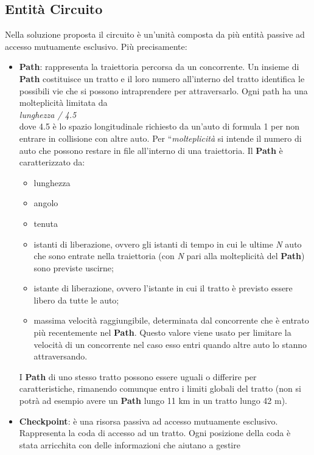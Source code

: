 \label{soluzione_problematiche}
\subsection{Entit\`{a} Circuito}
\label{entita_circuito}
Nella soluzione proposta il circuito è un'unità composta da più entità passive
ad accesso mutuamente esclusivo. Più precisamente:
\begin{itemize}
\item \textbf{Path}: rappresenta la traiettoria percorsa da un concorrente. Un
insieme di \textbf{Path} costituisce un tratto e il loro
numero all'interno del tratto identifica le possibili vie che si possono intraprendere per attraversarlo. 
Ogni path ha una molteplicità limitata da\\

\emph{lunghezza / 4.5}\\
dove 4.5 è lo spazio longitudinale richiesto da un'auto di formula 1 per non entrare in collisione con altre auto. Per ``\emph{molteplicità}
si intende il numero di auto che possono restare in file all'interno di una traiettoria.
Il \textbf{Path} è caratterizzato da:
\begin{itemize}
\item lunghezza
\item angolo
\item tenuta
\item istanti di liberazione, ovvero gli istanti di tempo 
in cui le ultime \emph{N} auto che sono entrate nella traiettoria (con \emph{N} pari alla molteplicità del \textbf{Path}) sono previste uscirne;
\item istante di liberazione, ovvero l'istante in cui il tratto è previsto essere libero da tutte le auto;
\item massima velocità raggiungibile, determinata dal concorrente che è entrato più recentemente nel \textbf{Path}.
Questo valore viene usato per limitare la velocità di un concorrente nel caso esso entri quando altre auto lo stanno
attraversando.
\end{itemize}
I \textbf{Path} di uno stesso tratto possono essere uguali o differire per
caratteristiche, rimanendo comunque entro i limiti globali del tratto
(non si potrà ad esempio avere un \textbf{Path} lungo 11 km in un tratto lungo 42 m).
\item \textbf{Checkpoint}: è una risorsa passiva ad accesso mutuamente
esclusivo. Rappresenta la coda di accesso ad un tratto. Ogni posizione
della coda è stata arricchita con delle informazioni che aiutano a gestire

\end{itemize}

